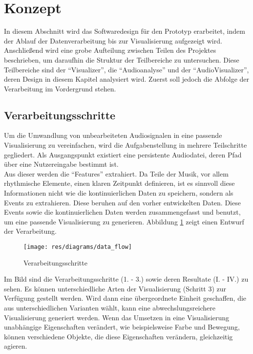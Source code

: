 \documentclass[11pt,a4paper]{article}
\begin{document}
\newpage
\section{Konzept}
In diesem Abschnitt wird das Softwaredesign für den Prototyp erarbeitet, indem der Ablauf der Datenverarbeitung bis zur Visualisierung aufgezeigt wird. Anschließend wird eine grobe Aufteilung zwischen Teilen des Projektes beschrieben, um daraufhin die Struktur der Teilbereiche zu untersuchen. Diese Teilbereiche sind der ``Visualizer'', die ``Audioanalyse'' und der ``AudioVisualizer'', deren Design in diesem Kapitel analysiert wird. Zuerst soll jedoch die Abfolge der Verarbeitung im Vordergrund stehen.

\subsection{Verarbeitungsschritte}
Um die Umwandlung von unbearbeiteten Audiosignalen in eine passende Visualisierung zu vereinfachen, wird die Aufgabenstellung in mehrere Teilschritte gegliedert. Als Ausgangspunkt existiert eine persistente Audiodatei, deren Pfad über eine Nutzereingabe bestimmt ist.\\
Aus dieser werden die ``Features'' extrahiert. Da Teile der Musik, vor allem rhythmische Elemente, einen klaren Zeitpunkt definieren, ist es sinnvoll diese Informationen nicht wie die kontinuierlichen Daten zu speichern, sondern als Events zu extrahieren. Diese beruhen auf den vorher entwickelten Daten. Diese Events sowie die kontinuierlichen Daten werden zusammengefasst und benutzt, um eine passende Visualisierung zu generieren. Abbildung \ref{fig:Verarbeitungsschritte} zeigt einen Entwurf der Verarbeitung.
\begin{figure}[ht!]
\centering
\texttt{[image: res/diagrams/data\_flow]}
\caption[Verarbeitungsschritte]{Verarbeitungsschritte}
\label{fig:Verarbeitungsschritte}
\end{figure}

\noindent
Im Bild sind die Verarbeitungsschritte (1. - 3.) sowie deren Resultate (I. - IV.) zu sehen. Es können unterschiedliche Arten der Visualisierung (Schritt 3) zur Verfügung gestellt werden. Wird dann eine übergeordnete Einheit geschaffen, die aus unterschiedlichen Varianten wählt, kann eine abwechslungsreichere Visualisierung generiert werden. Wenn das Umsetzen in eine Visualisierung unabhängige Eigenschaften verändert, wie beispielsweise Farbe und Bewegung, können verschiedene Objekte, die diese Eigenschaften verändern, gleichzeitig agieren.
\end{document}
